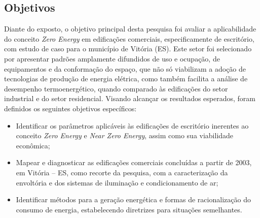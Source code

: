 \subsection{Objetivos}
\begin{onehalfspace}
Diante do exposto, o objetivo principal desta pesquisa foi avaliar 
a aplicabilidade do conceito \textit{Zero Energy}  em  edificações  comerciais,  
especificamente  de  escritório,  com  estudo  de  caso  para  o 
município  de  Vitória  (ES).  Este  setor  foi  selecionado  por  
apresentar  padrões  amplamente difundidos  de  uso  e  ocupação,  
de  equipamentos  e  da  conformação  do  espaço,  que  não  
só viabilizam  a  adoção  de  tecnologias  de  produção  de  energia  
elétrica,  como  também  facilita  a análise de desempenho termoenergético, 
quando comparado às edificações do setor industrial e do setor residencial.\newline
Visando alcançar os resultados esperados, foram definidos os seguintes 
objetivos específicos:
\begin{itemize}
    \item Identificar os parâmetros aplicáveis às edificações de escritório 
    inerentes ao conceito \textit{Zero Energy} e \textit{Near Zero Energy}, assim como sua 
    viabilidade econômica;
    \item Mapear e diagnosticar as edificações comerciais concluídas a partir 
    de 2003, em Vitória – ES,  como  recorte  da  pesquisa,  com  a  
    caracterização  da  envoltória  e  dos  sistemas  de iluminação e 
    condicionamento de ar;
    \item Identificar métodos para a geração energética e formas de 
    racionalização do consumo de energia, estabelecendo diretrizes para 
    situações semelhantes.
\end{itemize}
\end{onehalfspace}